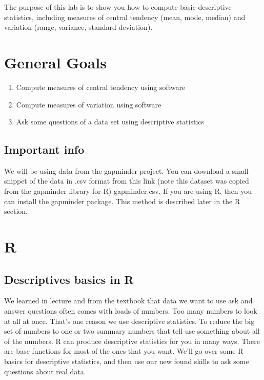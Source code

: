 \documentclass[
]{book}
\providecommand{\tightlist}{%
  \setlength{\itemsep}{0pt}\setlength{\parskip}{0pt}}
\begin{document}
The purpose of this lab is to show you how to compute basic descriptive statistics, including measures of central tendency (mean, mode, median) and variation (range, variance, standard deviation).

\hypertarget{general-goals-1}{%
\section{General Goals}\label{general-goals-1}}

\begin{enumerate}
\def\labelenumi{\arabic{enumi}.}
\tightlist
\item
  Compute measures of central tendency using software
\item
  Compute measures of variation using software
\item
  Ask some questions of a data set using descriptive statistics
\end{enumerate}

\hypertarget{important-info-1}{%
\subsection{Important info}\label{important-info-1}}

We will be using data from the gapminder project. You can download a small snippet of the data in .csv format from this link (note this dataset was copied from the gapminder library for R) gapminder.csv. If you are using R, then you can install the gapminder package. This method is described later in the R section.

\hypertarget{r-2}{%
\section{R}\label{r-2}}

\hypertarget{descriptives-basics-in-r}{%
\subsection{Descriptives basics in R}\label{descriptives-basics-in-r}}

We learned in lecture and from the textbook that data we want to use ask and answer questions often comes with loads of numbers. Too many numbers to look at all at once. That's one reason we use descriptive statistics. To reduce the big set of numbers to one or two summary numbers that tell use something about all of the numbers. R can produce descriptive statistics for you in many ways. There are base functions for most of the ones that you want. We'll go over some R basics for descriptive statistics, and then use our new found skills to ask some questions about real data.
\end{document}
